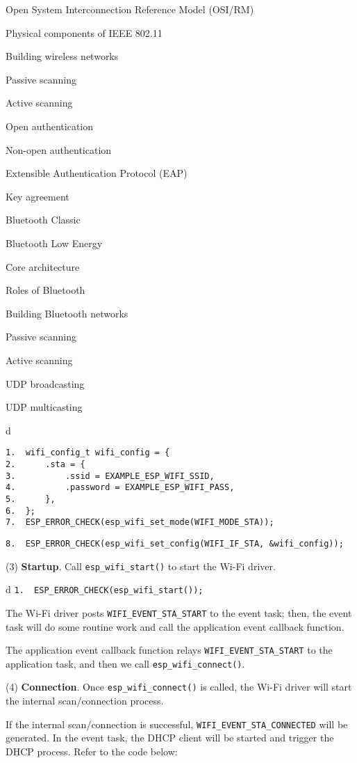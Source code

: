 \documentclass[a4paper,12pt]{book}
\begin{document}
\begin{term}{Open System Interconnection Reference Model (OSI/RM)}
\begin{term}{Physical components of IEEE 802.11}
\begin{term}{Building wireless networks}
\begin{term}{Passive scanning}
\begin{term}{Active scanning}
\begin{term}{Open authentication}
\begin{term}{Non-open authentication}
\begin{term}{Extensible Authentication Protocol (EAP)}
\begin{term}{Key agreement}
\begin{term}{Bluetooth Classic}
\begin{term}{Bluetooth Low Energy}
\begin{term}{Core architecture}
\begin{term}{Roles of Bluetooth}
\begin{term}{Building Bluetooth networks}
\begin{term}{Passive scanning}
\begin{term}{Active scanning}
\begin{term}{UDP broadcasting}
\begin{term}{UDP multicasting}
\begin{tabular}{d}
\vspace{2pt}
\begin{verbatim}
1.  wifi_config_t wifi_config = {
2.      .sta = {
3.          .ssid = EXAMPLE_ESP_WIFI_SSID,
4.          .password = EXAMPLE_ESP_WIFI_PASS,
5.      },
6.  };
7.  ESP_ERROR_CHECK(esp_wifi_set_mode(WIFI_MODE_STA));
\end{verbatim}
\verb|8.  ESP_ERROR_CHECK(esp_wifi_set_config(WIFI_IF_STA, &wifi_config));|
\end{tabular}


(3) \textbf{Startup}. Call \verb|esp_wifi_start()| to start the Wi-Fi driver.


\begin{tabular}{d}
\verb|1.  ESP_ERROR_CHECK(esp_wifi_start());|
\end{tabular}


The Wi-Fi driver posts \verb|WIFI_EVENT_STA_START| to the event task; then, the event task will do some routine work and call the application event callback function.
    
The application event callback function relays \verb|WIFI_EVENT_STA_START| to the application task, and then we call \verb|esp_wifi_connect()|.

(4) \textbf{Connection}. Once \verb|esp_wifi_connect()| is called, the Wi-Fi driver will start the internal scan/connection process.

If the internal scan/connection is successful, \verb|WIFI_EVENT_STA_CONNECTED| will be generated. In the event task, the DHCP client will be started and trigger the DHCP process. Refer to the code below:



\end{term}
\end{term}
\end{term}
\end{term}
\end{term}
\end{term}
\end{term}
\end{term}
\end{term}
\end{term}
\end{term}
\end{term}
\end{term}
\end{term}
\end{term}
\end{term}
\end{term}
\end{term}
\end{document}
